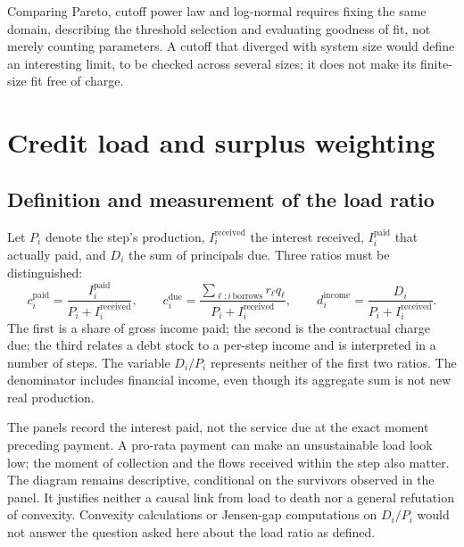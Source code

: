 Comparing Pareto, cutoff power law and log-normal requires
fixing the same domain, describing the threshold selection and evaluating
goodness of fit, not merely counting parameters. A cutoff
that diverged with system size would define an interesting
limit, to be checked across several sizes; it does not make
its finite-size fit free of charge.

\section{Credit load and surplus weighting}
\subsection{Definition and measurement of the load ratio}\label{sec:charge}
Let $P_i$ denote the step's production, $I_i^{\text{received}}$ the interest
received, $I_i^{\text{paid}}$ that actually paid, and $D_i$ the
sum of principals due. Three ratios must be distinguished:
\[
 c_i^{\text{paid}}=\frac{I_i^{\text{paid}}}{P_i+I_i^{\text{received}}},\qquad
 c_i^{\text{due}}=\frac{\sum_{\ell:i\,\mathrm{borrows}}r_\ell q_\ell}
                         {P_i+I_i^{\text{received}}},\qquad
 d_i^{\text{income}}=\frac{D_i}{P_i+I_i^{\text{received}}}.
\]
The first is a share of gross income paid; the second is the
contractual charge due; the third relates a debt stock
to a per-step income and is interpreted in a number of steps. The
variable $D_i/P_i$ represents neither of the first two ratios.
The denominator includes financial income, even though its
aggregate sum is not new real production.


The panels record the interest paid, not the service due
at the exact moment preceding payment. A pro-rata payment can
make an unsustainable load look low; the moment of
collection and the flows received within the step also matter.
The diagram remains descriptive, conditional on the survivors observed
in the panel. It justifies neither a causal link from load to
death nor a general refutation of convexity. Convexity
calculations or Jensen-gap computations on $D_i/P_i$ would not answer
the question asked here about the load ratio as defined.

